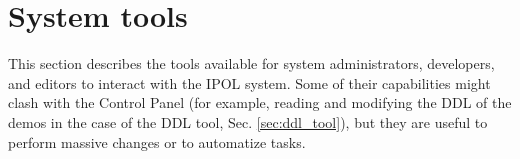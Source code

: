 \section{System tools}
This section describes the tools available for system administrators, developers, and editors to interact with the IPOL system. Some of their capabilities might clash with the Control Panel (for example, reading and modifying the DDL of the demos in the case of the DDL tool, Sec. \ref{sec:ddl_tool}), but they are useful to perform massive changes or to automatize tasks.





